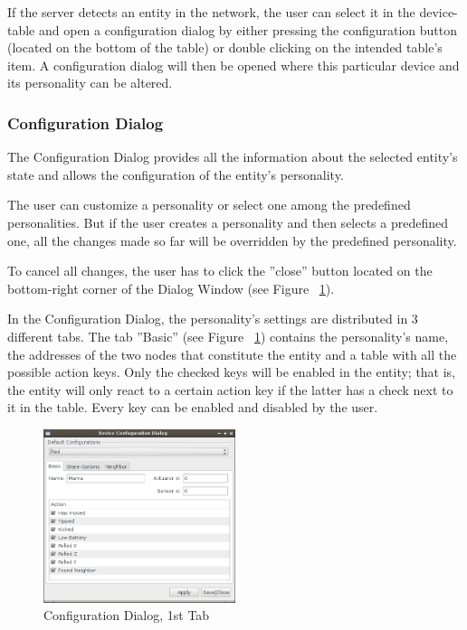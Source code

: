 If the server detects an entity in the network, the user can select it in the device-table and open a configuration dialog by either pressing the configuration button (located on the bottom of the table) or double clicking on the intended table's item. A configuration dialog will then be opened where this particular device and its personality can be altered.

\subsubsection{Configuration Dialog}

The Configuration Dialog provides all the information about the selected entity's state and allows the configuration of the entity's personality. 

The user can customize a personality or select one among the predefined personalities. But if the user creates a personality and then selects a predefined one, all the changes made so far will be overridden by the predefined personality. 

To cancel all changes, the user has to click the ''close'' button located on the bottom-right corner of the Dialog Window (see Figure ~\ref{fig:java-server-config01}).   

In the Configuration Dialog, the personality's settings are distributed in 3 different tabs. The tab ''Basic'' (see Figure ~\ref{fig:java-server-config01}) contains the personality's name, the addresses of the two nodes that constitute the entity and a table with all the possible action keys. Only the checked keys will be enabled in the entity; that is, the entity will only react to a certain action key if the latter has a check next to it in the table. Every key can be enabled and disabled by the user. 


\begin{figure}[h!]
 \centering
 \includegraphics[width= 0.5\textwidth, clip=true  ,keepaspectratio=true]{./pic/java-server-config01.png}
 \caption{Configuration Dialog, 1st Tab}
 \label{fig:java-server-config01}
\end{figure}

